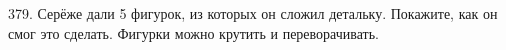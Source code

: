 379. Серёже дали 5 фигурок, из которых он сложил детальку. Покажите, как он смог это сделать.
Фигурки можно крутить и переворачивать.\\
\begin{figure}[ht!]
\end{figure}\\
